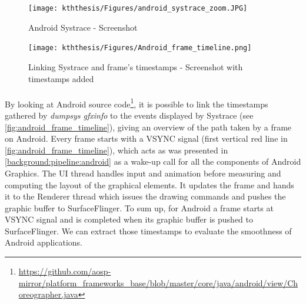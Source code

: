     \begin{figure}
        \centering
        \texttt{[image: kththesis/Figures/android\_systrace\_zoom.JPG]}
        \caption{Android Systrace - Screenshot}
        \label{fig:android_systrace_zoom}
    \end{figure}
    
    \begin{figure}[!ht]
        \centering
        \texttt{[image: kththesis/Figures/Android\_frame\_timeline.png]}
        \caption{Linking Systrace and frame's timestamps - Screenshot with timestamps added}
        \label{fig:android_frame_timeline}
    \end{figure}
    
    \paragraph{}
    By looking at Android source code\footnote{\url{https://github.com/aosp-mirror/platform_frameworks_base/blob/master/core/java/android/view/Choreographer.java}}, it is possible to link the timestamps gathered by \textit{dumpsys gfxinfo} to the events displayed by Systrace (see \autoref{fig:android_frame_timeline}), giving an overview of the path taken by a frame on Android. \newline
    \indent Every frame starts with a VSYNC signal (first vertical red line in \autoref{fig:android_frame_timeline}), which acts as was presented in \autoref{background:pipeline:android} as a wake-up call for all the components of Android Graphics. The UI thread handles input and animation before measuring and computing the layout of the graphical elements. It updates the frame and hands it to the Renderer thread which issues the drawing commands and pushes the graphic buffer to SurfaceFlinger. To sum up, for Android a frame starts at VSYNC signal and is completed when its graphic buffer is pushed to SurfaceFlinger. We can extract those timestamps to evaluate the smoothness of Android applications.
    
    
    
